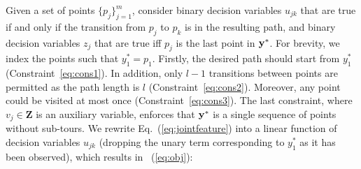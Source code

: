 
Given a set of points $\{p_j\}_{j=1}^m$, 
consider binary decision variables $u_{jk}$ that are true if and only if
the transition from $p_j$ to $p_k$ is in the resulting path,
and binary decision variables $z_j$ that are true iff $p_j$ is the last point in $\mathbf{y}^*$.
For brevity, we index the points such that $y_1^* = p_1$.
Firstly, the desired path should start from $y_1^*$ (Constraint~\ref{eq:cons1}).
In addition, only $l\!-\!1$ transitions between points are permitted as the path length is $l$ (Constraint~\ref{eq:cons2}).
Moreover, any point could be visited at most once (Constraint~\ref{eq:cons3}).
The last constraint, where $v_j \in \mathbf{Z}$ is an auxiliary variable,
enforces that $\mathbf{y}^*$ is a single sequence of points without sub-tours.
We rewrite Eq.~(\ref{eq:jointfeature}) into a linear function of decision variables $u_{jk}$
(dropping the unary term corresponding to $y_1^*$ as it has been observed), which results in ~(\ref{eq:obj}):

